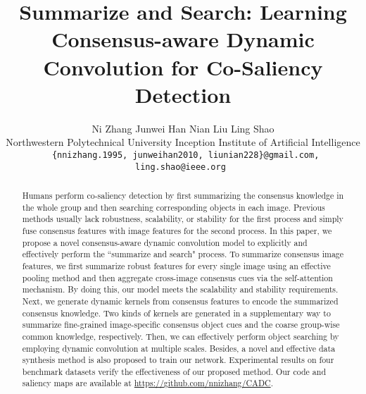 \documentclass[10pt,twocolumn,letterpaper]{article}
\begin{document}
\title{Summarize and Search: Learning Consensus-aware Dynamic Convolution for Co-Saliency Detection}

\author{
	Ni Zhang
	\hspace{25pt}
	Junwei Han
	\hspace{25pt}
	Nian Liu\footnotemark[1]
	\hspace{25pt}
	Ling Shao
	\hspace{25pt}
	\\
	Northwestern Polytechnical University
	\hspace{8pt}
	Inception Institute of Artificial Intelligence
	\\
	{\tt\small
    \{nnizhang.1995, junweihan2010, liunian228\}@gmail.com, ling.shao@ieee.org
    }
}

\maketitle
{} 
\ificcvfinal\thispagestyle{empty}\fi


\begin{abstract}
   Humans perform co-saliency detection by first summarizing the consensus knowledge in the whole group and then searching corresponding objects in each image. Previous methods usually lack robustness, scalability, or stability for the first process and simply fuse consensus features with image features for the second process.
   In this paper, we propose a novel consensus-aware dynamic convolution model to explicitly and effectively perform the ``summarize and search" process. To summarize consensus image features, we first summarize robust features for every single image using an effective pooling method and then aggregate cross-image consensus cues via the self-attention mechanism. By doing this, our model meets the scalability and stability requirements. Next, we generate dynamic kernels from consensus features
   to encode the summarized consensus knowledge. Two kinds of kernels are generated in a supplementary way to summarize fine-grained image-specific consensus object cues and the coarse group-wise common knowledge, respectively. Then, we can effectively perform object searching by employing dynamic convolution at multiple scales.
   Besides, a novel and effective data synthesis method is also proposed to train our network.
   Experimental results on four benchmark datasets verify the effectiveness of our proposed method. Our code and saliency maps are available at \url{https://github.com/nnizhang/CADC}. 
\end{abstract}
\end{document}
